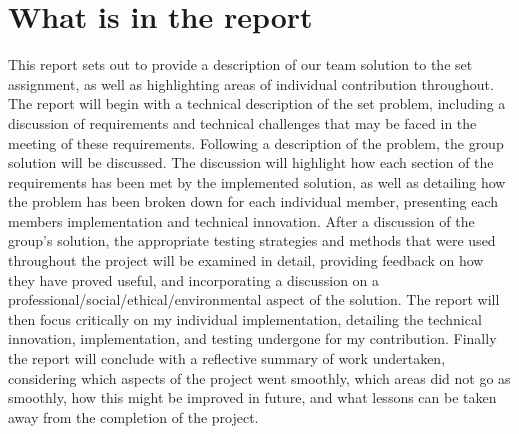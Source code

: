 \section{What is in the report}
This report sets out to provide a description of our team solution to the set 
assignment, as well as highlighting areas of individual contribution throughout.
The report will begin with a technical description of the set problem, 
including a discussion of requirements and technical challenges that may be 
faced in the meeting of these requirements. 
Following a description of the problem, the group solution will be discussed. 
The discussion will highlight how each section of the requirements has been met 
by the implemented solution, as well as detailing how the problem has been broken 
down for each individual member, presenting each members implementation and 
technical innovation. 
After a discussion of the group's solution, the appropriate testing strategies 
and methods that were used throughout the project will be examined in detail, 
providing feedback on how they have proved useful, and incorporating a 
discussion on a professional/social/ethical/environmental aspect of the solution.
The report will then focus critically on my individual implementation, 
detailing the technical innovation, implementation, and testing undergone for my 
contribution. 
Finally the report will conclude with a reflective summary of work 
undertaken, considering which aspects of the project went smoothly, which areas
did not go as smoothly, how this might be improved in future, and what lessons 
can be taken away from the completion of the project. 
